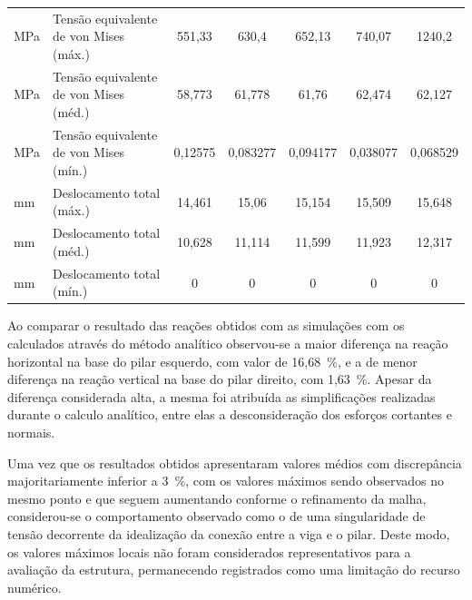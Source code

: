 \documentclass[a4paper, 12pt]{article}
\begin{document}
\begin{table}[H]
{\begin{tabular}{l l c c c c c}
        \hline
        MPa & Tensão equivalente de von Mises (máx.)
            & 551,33 & 630,4 & 652,13 & 740,07 & 1240,2 \\
        MPa & Tensão equivalente de von Mises (méd.)
            & 58,773 & 61,778 & 61,76 & 62,474 & 62,127 \\
        MPa & Tensão equivalente de von Mises (mín.)
            & 0,12575 & 0,083277 & 0,094177 & 0,038077 & 0,068529 \\
        \hline
        mm & Deslocamento total (máx.)
           & 14,461 & 15,06 & 15,154 & 15,509 & 15,648 \\
        mm & Deslocamento total (méd.)
           & 10,628 & 11,114 & 11,599 & 11,923 & 12,317 \\
        mm & Deslocamento total (mín.)
           & 0 & 0 & 0 & 0 & 0 \\
        \hline
    \end{tabular}%
    }
\end{table}

Ao comparar o resultado das reações obtidos com as simulações com os calculados através do método analítico observou-se a maior diferença na reação horizontal na base do pilar esquerdo, com valor de 16,68~\%, e a de menor diferença na reação vertical na base do pilar direito, com 1,63~\%. Apesar da diferença considerada alta, a mesma foi atribuída as simplificações realizadas durante o calculo analítico, entre elas a desconsideração dos esforços cortantes e normais.

Uma vez que os resultados obtidos apresentaram valores médios com discrepância majoritariamente inferior a 3~\%, com os valores máximos sendo observados no mesmo ponto e que seguem aumentando conforme o refinamento da malha, considerou-se o comportamento observado como o de uma singularidade de tensão decorrente da idealização da conexão entre a viga e o pilar. Deste modo, os valores máximos locais não foram considerados representativos para a avaliação da estrutura, permanecendo registrados como uma limitação do recurso numérico.
\end{document}
